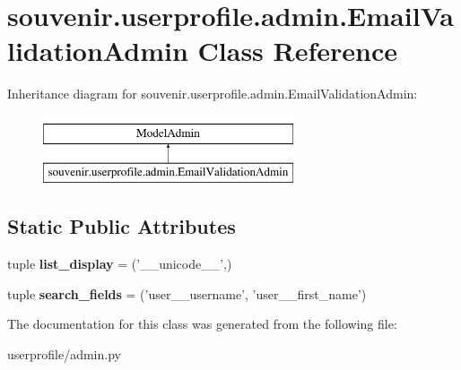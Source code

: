 \hypertarget{classsouvenir_1_1userprofile_1_1admin_1_1EmailValidationAdmin}{\section{souvenir.\-userprofile.\-admin.\-Email\-Validation\-Admin Class Reference}
\label{classsouvenir_1_1userprofile_1_1admin_1_1EmailValidationAdmin}
}
Inheritance diagram for souvenir.\-userprofile.\-admin.\-Email\-Validation\-Admin\-:\begin{figure}[H]
\begin{center}
\leavevmode
\includegraphics[height=2.000000cm]{classsouvenir_1_1userprofile_1_1admin_1_1EmailValidationAdmin}
\end{center}
\end{figure}
\subsection*{Static Public Attributes}
\begin{DoxyCompactItemize}
\item 
\hypertarget{classsouvenir_1_1userprofile_1_1admin_1_1EmailValidationAdmin_a101614636739f99c6347aeef1b8dfe9d}{tuple {\bfseries list\-\_\-display} = ('\-\_\-\-\_\-unicode\-\_\-\-\_\-',)}\label{classsouvenir_1_1userprofile_1_1admin_1_1EmailValidationAdmin_a101614636739f99c6347aeef1b8dfe9d}

\item 
\hypertarget{classsouvenir_1_1userprofile_1_1admin_1_1EmailValidationAdmin_a29235515ae87cd4bb65d7d9c0e478835}{tuple {\bfseries search\-\_\-fields} = ('user\-\_\-\-\_\-username', 'user\-\_\-\-\_\-first\-\_\-name')}\label{classsouvenir_1_1userprofile_1_1admin_1_1EmailValidationAdmin_a29235515ae87cd4bb65d7d9c0e478835}

\end{DoxyCompactItemize}


The documentation for this class was generated from the following file\-:\begin{DoxyCompactItemize}
\item 
userprofile/admin.\-py\end{DoxyCompactItemize}
